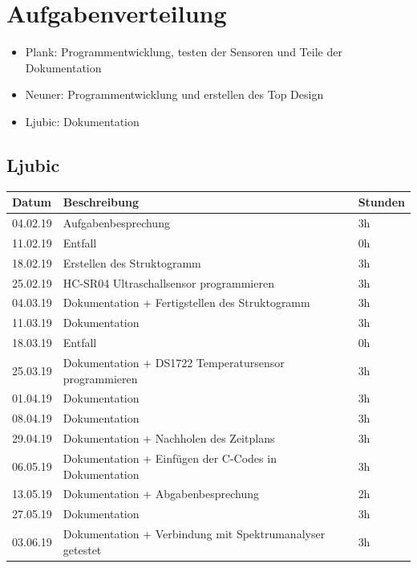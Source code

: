 \documentclass[12pt,a4paper,german]{article}
\begin{document}
\section{Aufgabenverteilung}
\begin{itemize}
	\item{Plank: Programmentwicklung, testen der Sensoren und Teile der 
		Dokumentation}

	\item{Neuner: Programmentwicklung und erstellen des Top Design}

	\item{Ljubic: Dokumentation}
\end{itemize}

\subsection{Ljubic}

\begin{table}[H]
\centering 
\begin{tabularx}{\textwidth}{|l|X|l|}
\hline
\textbf{Datum} & \textbf{Beschreibung} & \textbf{Stunden} \\ 
\hline
\hline
04.02.19 & Aufgabenbesprechung & 3h \\ 
\hline
11.02.19 & Entfall & 0h \\ 
\hline
18.02.19 & Erstellen des Struktogramm  & 3h \\ 
\hline
25.02.19 & HC-SR04 Ultraschallsensor programmieren & 3h \\ 
\hline
04.03.19 & Dokumentation + Fertigstellen des Struktogramm & 3h \\ 
\hline
11.03.19 & Dokumentation & 3h \\ 
\hline
18.03.19 & Entfall & 0h\\ 
\hline
25.03.19 & Dokumentation + DS1722 Temperatursensor programmieren & 3h \\ 
\hline
01.04.19 & Dokumentation & 3h \\ 
\hline
08.04.19 & Dokumentation & 3h \\ 
\hline
29.04.19 & Dokumentation + Nachholen des Zeitplans & 3h \\ 
\hline
06.05.19 & Dokumentation + Einfügen der C-Codes in Dokumentation  & 3h \\ 
\hline
13.05.19 & Dokumentation + Abgabenbesprechung & 2h \\
\hline
27.05.19 & Dokumentation & 3h \\
\hline
03.06.19 & Dokumentation + Verbindung mit Spektrumanalyser getestet & 3h \\
\hline
\end{tabularx}
\end{table}
\end{document}
